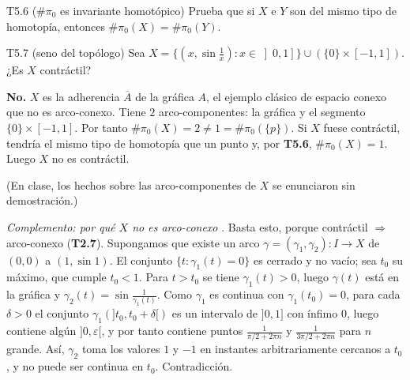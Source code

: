 \begin{ejercicio}{T5.6 ($\#\pi_0$ es invariante homotópico)}
Prueba que si $X$ e $Y$ son del mismo tipo de homotopía, entonces $\#\pi_0(X) = \#\pi_0(Y)$.

\end{ejercicio}

\begin{ejercicio}{T5.7 (seno del topólogo)}
Sea $X = \{(x,\sin\frac1x) : x \in \left]0,1\right]\} \cup (\{0\} \times [-1,1])$. ¿Es $X$ contráctil?

\sol {}

\textbf{No.} $X$ es la adherencia $\overline{A}$ de la gráfica $A$, el ejemplo clásico de espacio conexo que no es arco-conexo. Tiene $2$ arco-componentes: la gráfica y el segmento $\{0\} \times [-1,1]$. Por tanto $\#\pi_0(X) = 2 \neq 1 = \#\pi_0(\{p\})$. Si $X$ fuese contráctil, tendría el mismo tipo de homotopía que un punto y, por \textbf{T5.6}, $\#\pi_0(X) = 1$. Luego $X$ no es contráctil.

(En clase, los hechos sobre las arco-componentes de $X$ se enunciaron sin demostración.)

\medskip
\emph{Complemento: por qué $X$ no es arco-conexo} \fuentepropia. Basta esto, porque contráctil $\Rightarrow$ arco-conexo (\textbf{T2.7}). Supongamos que existe un arco $\gamma = (\gamma_1,\gamma_2) \colon I \to X$ de $(0,0)$ a $(1,\sin 1)$. El conjunto $\{t : \gamma_1(t) = 0\}$ es cerrado y no vacío; sea $t_0$ su máximo, que cumple $t_0 < 1$. Para $t > t_0$ se tiene $\gamma_1(t) > 0$, luego $\gamma(t)$ está en la gráfica y $\gamma_2(t) = \sin\frac{1}{\gamma_1(t)}$. Como $\gamma_1$ es continua con $\gamma_1(t_0) = 0$, para cada $\delta > 0$ el conjunto $\gamma_1(]t_0,t_0+\delta[)$ es un intervalo de $]0,1]$ con ínfimo $0$, luego contiene algún $]0,\varepsilon[$, y por tanto contiene puntos $\frac{1}{\pi/2 + 2\pi n}$ y $\frac{1}{3\pi/2 + 2\pi n}$ para $n$ grande. Así, $\gamma_2$ toma los valores $1$ y $-1$ en instantes arbitrariamente cercanos a $t_0$, y no puede ser continua en $t_0$. Contradicción.
\end{ejercicio}

